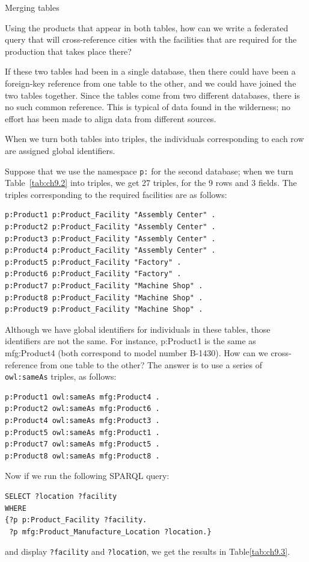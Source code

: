 \begin{challenge}{Merging tables}

Using the products that appear in both tables, how can we write a
federated query that will cross-reference cities with the facilities
that are required for the production that takes place there?

\solution

If these two tables had been in a single database, then there could have
been a foreign-key reference from one table to the other, and we could
have joined the two tables together. Since the tables come from two
different databases,
there is no such common reference. This is typical of data found in the
wilderness; no effort has been made to align data from different
sources.

When we turn both tables into triples, the individuals corresponding to
each row are assigned global identifiers.

Suppose that we use the namespace \texttt{p:} for the second database; when we
turn  Table~\ref{tab:ch9.2} into triples, we get 27 triples, for the 9 rows and 3
fields. The triples corresponding to the required facilities are as
follows:

\begin{lstlisting}
p:Product1 p:Product_Facility "Assembly Center" .
p:Product2 p:Product_Facility "Assembly Center" .
p:Product3 p:Product_Facility "Assembly Center" .
p:Product4 p:Product_Facility "Assembly Center" .
p:Product5 p:Product_Facility "Factory" .
p:Product6 p:Product_Facility "Factory" .
p:Product7 p:Product_Facility "Machine Shop" .
p:Product8 p:Product_Facility "Machine Shop" .
p:Product9 p:Product_Facility "Machine Shop" .
\end{lstlisting}

Although we have global identifiers for individuals in these tables,
those identifiers are not the same. For instance, p:Product1 is the same
as mfg:Product4 (both correspond to model number B-1430). How can we
cross-reference from one table to the other? The answer is to use a
series of \texttt{owl:sameAs} triples, as follows:

\begin{lstlisting}
p:Product1 owl:sameAs mfg:Product4 .
p:Product2 owl:sameAs mfg:Product6 .
p:Product4 owl:sameAs mfg:Product3 .
p:Product5 owl:sameAs mfg:Product1 .
p:Product7 owl:sameAs mfg:Product5 .
p:Product8 owl:sameAs mfg:Product8 .
\end{lstlisting}

Now if we run the following SPARQL query:

\begin{lstlisting}
SELECT ?location ?facility 
WHERE
{?p p:Product_Facility ?facility.
 ?p mfg:Product_Manufacture_Location ?location.}
\end{lstlisting}

and display \texttt{?facility} and \texttt{?location}, we get the results in Table\ref{tab:ch9.3}.
\end{challenge}

